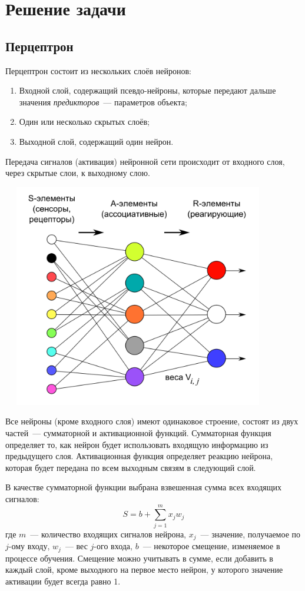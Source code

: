 \section{Решение задачи}

\subsection{Перцептрон}
	Перцептрон состоит из нескольких слоёв нейронов:
	\begin{enumerate}
		\item Входной слой, содержащий псевдо-нейроны, которые передают дальше значения \textit{предикторов}~--- параметров объекта;
		\item Один или несколько скрытых слоёв;
		\item Выходной слой, содержащий один нейрон.
	\end{enumerate}

	Передача сигналов (активация) нейронной сети происходит от входного слоя, через скрытые слои, к выходному слою.
	\parskip=0cm
	
	\includegraphics[width=450px, height=370px]{picture1.png}
	\parskip=0.2cm

	Все нейроны (кроме входного слоя) имеют одинаковое строение, состоят из двух частей~--- сумматорной и активационной функций.
	Сумматорная функция определяет то, как нейрон будет использовать входящую информацию из предыдущего слоя.
	Активационная функция определяет реакцию нейрона, которая будет передана по всем выходным связям в следующий слой.

	В качестве сумматорной функции выбрана взвешенная сумма всех входящих сигналов:
	\[
		S = b + \sum_{j = 1}^m x_j w_j
	\]
	где $m$~--- количество входящих сигналов нейрона, $x_j$~--- значение, получаемое по $j$-ому входу, $w_j$~--- вес $j$-ого входа,
	$b$~--- некоторое смещение, изменяемое в процессе обучения.	Смещение можно учитывать в сумме,
	если добавить в каждый слой, кроме выходного на первое место нейрон, у которого значение активации будет всегда равно 1.

